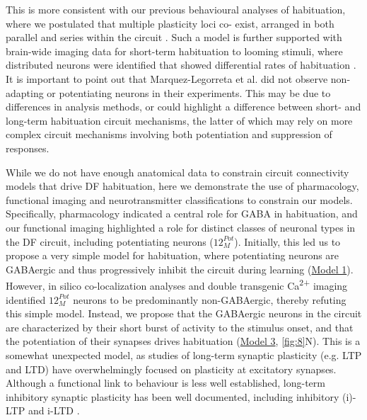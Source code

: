 \documentclass[9pt,lineno]{RandlettLab_elife}
\begin{document}
This is more consistent with our previous behavioural analyses of habituation, where we postulated that multiple plasticity loci co- exist, arranged in both parallel and series within the circuit \cite{Randlett2019-fi}. Such a model is further supported with brain-wide imaging data for short-term habituation to looming stimuli, where distributed neurons were identified that showed differential rates of habituation \cite{Marquez-Legorreta2022-ih}. It is important to point out that Marquez-Legorreta et al. did not observe non-adapting or potentiating neurons in their experiments. This may be due to differences in analysis methods, or could highlight a difference between short- and long-term habituation circuit mechanisms, the latter of which may rely on more complex circuit mechanisms involving both potentiation and suppression of responses. 

While we do not have enough anatomical data to constrain circuit connectivity models that drive DF habituation, here we demonstrate the  use of pharmacology, functional imaging and neurotransmitter classifications to constrain our models. Specifically, pharmacology indicated a central role for GABA in habituation, and our functional imaging highlighted a role for distinct classes of neuronal types in the DF circuit, including potentiating neurons ($12_{M}^{Pot}$). Initially, this led us to propose a very simple model for habituation, where potentiating neurons are GABAergic and thus progressively inhibit the circuit during learning (\underline{Model 1}). However, in silico co-localization analyses and double transgenic Ca\textsuperscript{2+} imaging identified $12_{M}^{Pot}$ neurons to be  predominantly non-GABAergic, thereby refuting this simple model. Instead, we propose that the GABAergic neurons in the circuit are characterized by their short burst of activity to the stimulus onset, and that the potentiation of their synapses drives habituation (\underline{Model 3}, \autoref{fig:8}N). This is a somewhat unexpected model, as studies of long-term synaptic plasticity (e.g. LTP and LTD) have overwhelmingly focused on plasticity at excitatory synapses. Although a functional link to behaviour is less well established, long-term inhibitory synaptic plasticity has been well documented, including inhibitory (i)-LTP  and i-LTD \cite{Castillo2011-tq}.
 
\end{document}
